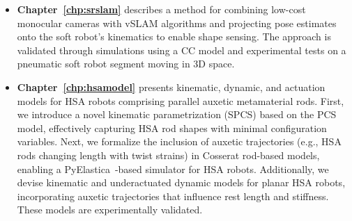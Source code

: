 \begin{itemize}
    \item \textbf{Chapter~\ref{chp:srslam}} describes a method for combining low-cost monocular cameras with \gls{vSLAM} algorithms and projecting pose estimates onto the soft robot’s kinematics to enable shape sensing. The approach is validated through simulations using a \gls{CC} model and experimental tests on a pneumatic soft robot segment moving in 3D space.
    \item \textbf{Chapter~\ref{chp:hsamodel}} presents kinematic, dynamic, and actuation models for \gls{HSA} robots comprising parallel auxetic metamaterial rods. First, we introduce a novel kinematic parametrization (\gls{SPCS}) based on the \gls{PCS}~\citep{renda2018discrete} model, effectively capturing \gls{HSA} rod shapes with minimal configuration variables. Next, we formalize the inclusion of auxetic trajectories (e.g., \gls{HSA} rods changing length with twist strains) in Cosserat rod-based models, enabling a PyElastica~\citep{naughton2021elastica}-based simulator for \gls{HSA} robots. Additionally, we devise kinematic and underactuated dynamic models for planar \gls{HSA} robots, incorporating auxetic trajectories that influence rest length and stiffness. These models are experimentally validated.  

\end{itemize}
